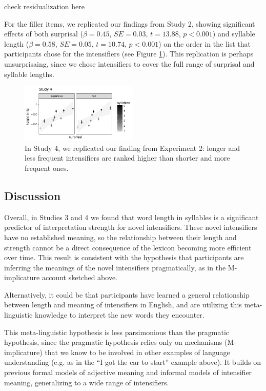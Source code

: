 \documentclass[10pt,letterpaper]{article}
\newcommand{\todo}[1]{{\color{red}#1}}
\begin{document}
\todo{check residualization here}

For the filler items, we replicated our findings from Study 2, showing significant effects of both surprisal ($\beta=0.45$, $SE=0.03$, $t=13.88$, $p<0.001$)
and syllable length ($\beta=0.58$, $SE=0.05$, $t=10.74$, $p<0.001$) on the order in the list that participants chose for the intensifiers (see Figure \ref{fig:plot_study4}).
This replication is perhaps unsurprisaing, since we chose intensifiers to cover the full range of surprisal and syllable lengths.

\begin{figure}[hbt]
\begin{center}
\includegraphics[width=0.5\textwidth]{images/plot_study4.pdf}
\end{center}
\caption{In Study 4, we replicated our finding from Experiment 2: longer and less frequent intensifiers are ranked higher than shorter and more frequent ones.}
\label{fig:plot_study4}
\end{figure}


\subsection{Discussion}
Overall, in Studies 3 and 4 we found that word length in syllables is a significant predictor of interpretation strength for novel intensifiers.
These novel intensifiers have no established meaning, so the relationship between their length and strength cannot be a direct consequence of the lexicon becoming more efficient over time.
This result is consistent with the hypothesis that participants are inferring the meanings of the novel intensifiers pragmatically, as in the M-implicature account sketched above.

Alternatively, it could be that participants have learned a general relationship between length and meaning of intensifiers in English, and are utilizing this meta-linguistic knowledge to interpret the new words they encounter.

This meta-linguistic hypothesis is less parsimonious than the pragmatic hypothesis, since the pragmatic hypothesis relies only on mechanisms (M-implicature) that we know to be involved in other examples of language understanding (e.g. as in the ``I got the car to start'' example above).
It builds on previous formal models of adjective meaning and informal models of intensifier meaning, generalizing to a wide range of intensifiers.
\end{document}
